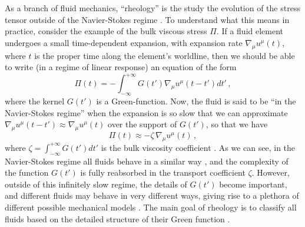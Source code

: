 \documentclass[a4paper, amsfonts, amssymb, amsmath, reprint, showkeys, nofootinbib, twoside, onecolumn,notitlepage]{revtex4-1}
\begin{document}
As a branch of fluid mechanics, ``rheology'' is the study the evolution of the stress tensor outside of the Navier-Stokes regime \cite{Malkin_book}. To understand what this means in practice, consider the example of the bulk viscous stress $\Pi$. If   a fluid element undergoes a small time-dependent expansion, with expansion rate $\nabla_\mu u^\mu (t)$, where $t$ is the proper time along the element's worldline, then we should be able to write (in a regime of linear response) an equation of the form \cite{Denicol_Relaxation_2011}
\begin{equation}\label{babibbo}
\Pi(t)= -\int_{-\infty}^{+\infty} \! \! \! G(t')\nabla_\mu u^\mu(t-t') dt' \, ,
\end{equation}
where the kernel $G(t')$ is a Green-function. Now, the fluid is said to be ``in the Navier-Stokes regime'' \cite{LindblomRelaxation1996} when the expansion is so slow that we can approximate $\nabla_\mu u^\mu(t-t') \approx \nabla_\mu u^\mu(t)$ over the support of $G(t')$, so that we have 
\begin{equation}\label{Pippo}
\Pi(t)\approx - \zeta \, \nabla_\mu u^\mu(t) \, ,
\end{equation}
where $\zeta=\int_{-\infty}^{+\infty}  G(t') dt'$ is the bulk viscosity coefficient \cite{landau6}. As we can see, in the Navier-Stokes regime all fluids behave in a similar way \cite{Geroch1995}, and the complexity of the function $G(t')$ is fully reabsorbed in the transport coefficient $\zeta$. However, outside of this infinitely slow regime, the details of $G(t')$ become important, and different fluids may behave in very different ways, giving rise to a plethora of different possible mechanical models \cite{Geroch_Lindblom_1991_causal,GavassinoNonHydro2022}. The main goal of rheology is to classify all fluids based on the detailed structure of their Green function \cite{Malkin_book}.
\end{document}
